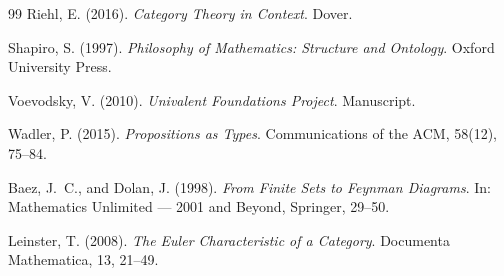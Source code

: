 \documentclass[12pt]{article}
\theoremstyle{definition}
\theoremstyle{remark}
\begin{document}
\begin{thebibliography}{99}
Riehl, E. (2016). \emph{Category Theory in Context}. Dover.

Shapiro, S. (1997). \emph{Philosophy of Mathematics: Structure and Ontology}. Oxford University Press.

Voevodsky, V. (2010). \emph{Univalent Foundations Project}. Manuscript.

Wadler, P. (2015). \emph{Propositions as Types}. Communications of the ACM, 58(12), 75--84.

Baez, J.\ C., and Dolan, J. (1998). \emph{From Finite Sets to Feynman Diagrams}. In: Mathematics Unlimited --- 2001 and Beyond, Springer, 29--50.

Leinster, T. (2008). \emph{The Euler Characteristic of a Category}. Documenta Mathematica, 13, 21--49.

\end{thebibliography}
\end{document}
